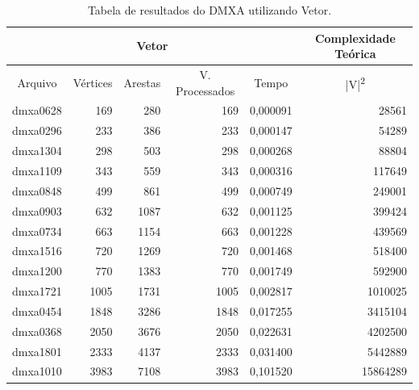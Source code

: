 \documentclass[
	12pt,				%
	oneside,			%
	a4paper,			%
	english,			%
	french,				%
	spanish,			%
	brazil,				%
	]{abntex2}
\begin{document}

\begin{table}[H]
  \centering    
  \begin{tabular}{|c|r|r|r|r|r|}
    \toprule
    \multicolumn{5}{|c|}{\cellcolor{gray!25}\textbf{Vetor}} & \multicolumn{1}{|c|}{\cellcolor{gray!25}\textbf{Complexidade Teórica}}\\
    \midrule
    \multicolumn{1}{|c|}{\cellcolor{gray!10}Arquivo} & \multicolumn{1}{|c|}{\cellcolor{gray!10}Vértices} & \multicolumn{1}{|c|}{\cellcolor{gray!10}Arestas} & \multicolumn{1}{|c|}{\cellcolor{gray!10}V. Processados} & \multicolumn{1}{|c|}{\cellcolor{gray!10}Tempo} & \multicolumn{1}{|c|}{\cellcolor{gray!10}|V|\textsuperscript{2}}\\
    \hline
    dmxa0628	&	169	&	280	&	169	&	0,000091	&	28561	\\
    \hline
    dmxa0296	&	233	&	386	&	233	&	0,000147	&	54289	\\
    \hline
    dmxa1304	&	298	&	503	&	298	&	0,000268	&	88804	\\
    \hline
    dmxa1109	&	343	&	559	&	343	&	0,000316	&	117649	\\
    \hline
    dmxa0848	&	499	&	861	&	499	&	0,000749	&	249001	\\
    \hline
    dmxa0903	&	632	&	1087	&	632	&	0,001125	&	399424	\\
    \hline
    dmxa0734	&	663	&	1154	&	663	&	0,001228	&	439569	\\
    \hline
    dmxa1516	&	720	&	1269	&	720	&	0,001468	&	518400	\\
    \hline
    dmxa1200	&	770	&	1383	&	770	&	0,001749	&	592900	\\
    \hline
    dmxa1721	&	1005	&	1731	&	1005	&	0,002817	&	1010025	\\
    \hline
    dmxa0454	&	1848	&	3286	&	1848	&	0,017255	&	3415104	\\
    \hline
    dmxa0368	&	2050	&	3676	&	2050	&	0,022631	&	4202500	\\
    \hline
    dmxa1801	&	2333	&	4137	&	2333	&	0,031400	&	5442889	\\
    \hline
    dmxa1010	&	3983	&	7108	&	3983	&	0,101520	&	15864289	\\    
    \hline
  \end{tabular}
  \caption{Tabela de resultados do DMXA utilizando Vetor.}  
  \label{tab:DmxaVetor}
\end{table}
\end{document}
